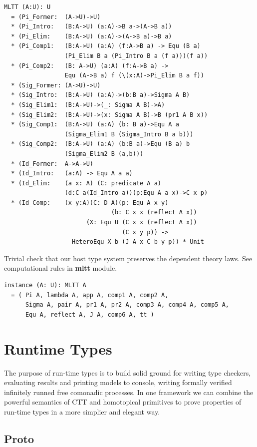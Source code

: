 \documentclass{article}
\begin{document}
\begin{lstlisting}[mathescape=true]
MLTT (A:U): U
  = (Pi_Former:  (A->U)->U)
  * (Pi_Intro:   (B:A->U) (a:A)->B a->(A->B a))
  * (Pi_Elim:    (B:A->U) (a:A)->(A->B a)->B a)
  * (Pi_Comp1:   (B:A->U) (a:A) (f:A->B a) -> Equ (B a)
                 (Pi_Elim B a (Pi_Intro B a (f a)))(f a))
  * (Pi_Comp2:   (B: A->U) (a:A) (f:A->B a) ->
                 Equ (A->B a) f (\(x:A)->Pi_Elim B a f))
  * (Sig_Former: (A->U)->U)
  * (Sig_Intro:  (B:A->U) (a:A)->(b:B a)->Sigma A B)
  * (Sig_Elim1:  (B:A->U)->(_: Sigma A B)->A)
  * (Sig_Elim2:  (B:A->U)->(x: Sigma A B)->B (pr1 A B x))
  * (Sig_Comp1:  (B:A->U) (a:A) (b: B a)->Equ A a
                 (Sigma_Elim1 B (Sigma_Intro B a b)))
  * (Sig_Comp2:  (B:A->U) (a:A) (b:B a)->Equ (B a) b
                 (Sigma_Elim2 B (a,b)))
  * (Id_Former:  A->A->U)
  * (Id_Intro:   (a:A) -> Equ A a a)
  * (Id_Elim:    (a x: A) (C: predicate A a)
                 (d:C a(Id_Intro a))(p:Equ A a x)->C x p)
  * (Id_Comp:    (x y:A)(C: D A)(p: Equ A x y)
                              (b: C x x (reflect A x))
                       (X: Equ U (C x x (reflect A x))
                                 (C x y p)) ->
                   HeteroEqu X b (J A x C b y p)) * Unit
\end{lstlisting}

Trivial check that our host type system preserves the dependent theory laws.
See computational rules in {\bf mltt} module.

\begin{lstlisting}[mathescape=true]
instance (A: U): MLTT A
  = ( Pi A, lambda A, app A, comp1 A, comp2 A,
      Sigma A, pair A, pr1 A, pr2 A, comp3 A, comp4 A, comp5 A,
      Equ A, reflect A, J A, comp6 A, tt )
\end{lstlisting}

\section{Runtime Types}

The purpose of run-time types is to build solid ground for
writing type checkers, evaluating results and printing models to console,
writing formally verified infinitely runned free comonadic processes.
In one framework we can combine the powerful semantics of CTT and
homotopical primitives to prove properties of run-time types in
a more simplier and elegant way.

\subsection{Proto}
\end{document}
